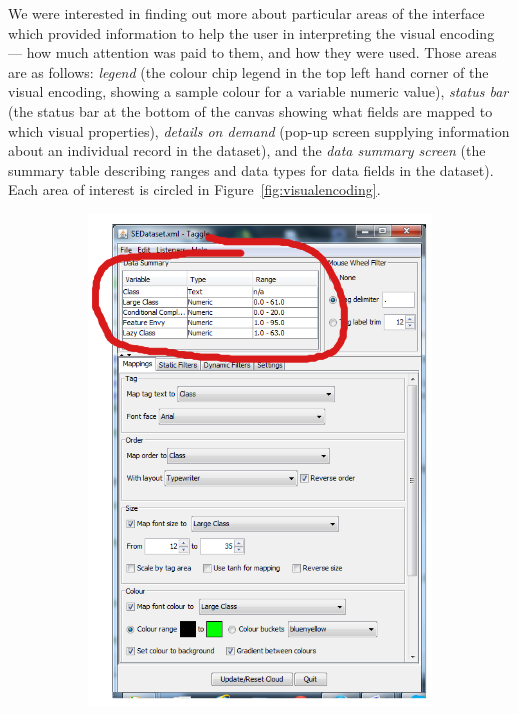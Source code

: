 We were interested in finding out more about particular areas of the interface which provided information to help the user in interpreting the visual encoding --- how much attention was paid to them, and how they were used. Those areas are as follows: \emph{legend} (the colour chip legend in the top left hand corner of the visual encoding, showing a sample colour for a variable numeric value), \emph{status bar} (the status bar at the bottom of the canvas showing what fields are mapped to which visual properties), \emph{details on demand} (pop-up screen supplying information about an individual record in the dataset), and the \emph{data summary screen} (the summary table describing ranges and data types for data fields in the dataset). Each area of interest is circled in Figure~\vref{fig:visualencoding}.

\begin{figure}[!htb]
\begin{subfigure}{.4\textwidth}
	\centering
  \includegraphics[scale=0.27]{interfacecircled.png}

\end{subfigure}
\end{figure}
